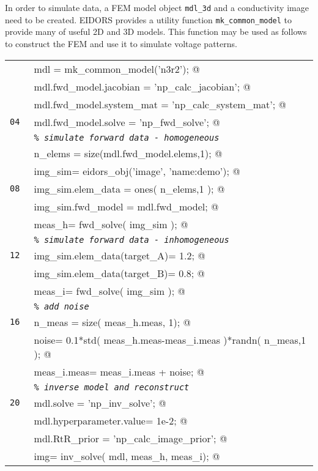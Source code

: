 \documentclass[12pt]{iopart}
\makeatletter
\newcommand{\CODEstart}{\medskip\begin{tabular}{ll}}
\newcommand{\CN}{\tt\scriptsize} %
\newcommand{\CC}{&\small\verb@}   % start code
\newcommand{\CI}{&\small\tt\em}   % start code
\newcommand{\CODEend}{\end{tabular}\medskip}
\makeatother
\begin{document}
In order to simulate data, a FEM model object {\tt mdl\_3d}
and a conductivity image need to be created.
EIDORS provides a utility function {\tt mk\_common\_model}
to provide many of useful 2D and 3D models. This function
may be used as follows to construct the FEM and use it
to simulate voltage patterns.

\CODEstart
\CN    \CC mdl  = mk_common_model('n3r2');   @\\[-3pt]
\CN    \CC mdl.fwd_model.jacobian   = 'np_calc_jacobian';   @\\[-3pt]
\CN    \CC mdl.fwd_model.system_mat = 'np_calc_system_mat';   @\\[-3pt]
\CN 04 \CC mdl.fwd_model.solve      = 'np_fwd_solve';   @\\[-3pt]
\CN    \CI \% simulate forward data - homogeneous \\[-3pt]
\CN    \CC n_elems = size(mdl.fwd_model.elems,1);   @\\[-3pt]
\CN    \CC img_sim= eidors_obj('image', 'name:demo');   @\\[-3pt]
\CN 08 \CC img_sim.elem_data = ones( n_elems,1 );    @\\[-3pt]
\CN    \CC img_sim.fwd_model = mdl.fwd_model;   @\\[-3pt]
\CN    \CC meas_h= fwd_solve( img_sim );   @\\[-3pt]
\CN    \CI \% simulate forward data - inhomogeneous \\[-3pt]
\CN 12 \CC img_sim.elem_data(target_A)= 1.2;   @\\[-3pt]
\CN    \CC img_sim.elem_data(target_B)= 0.8;   @\\[-3pt]
\CN    \CC meas_i= fwd_solve( img_sim );   @\\[-3pt]
\CN    \CI \% add noise \\[-3pt]
\CN 16 \CC n_meas = size( meas_h.meas, 1); @\\[-3pt]
\CN    \CC noise= 0.1*std( meas_h.meas-meas_i.meas )*randn( n_meas,1 ); @\\[-3pt]
\CN    \CC meas_i.meas= meas_i.meas + noise; @\\[-3pt]
\CN    \CI \% inverse model and reconstruct\\[-3pt]
\CN 20 \CC mdl.solve               = 'np_inv_solve'; @\\[-3pt]
\CN    \CC mdl.hyperparameter.value= 1e-2; @\\[-3pt]
\CN    \CC mdl.RtR_prior           = 'np_calc_image_prior'; @\\[-3pt]
\CN    \CC img= inv_solve( mdl, meas_h, meas_i); @\\[-3pt]
\CODEend
\end{document}
